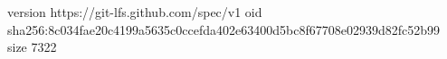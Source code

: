 version https://git-lfs.github.com/spec/v1
oid sha256:8c034fae20c4199a5635c0ccefda402e63400d5bc8f67708e02939d82fc52b99
size 7322

